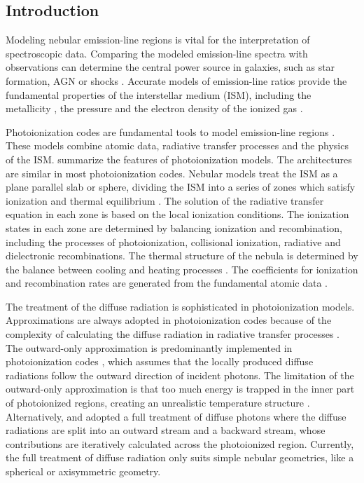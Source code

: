 \documentclass[twocolumn]{aastex62}
\begin{document}
\begin{CJK*}{UTF8}{gbsn}
\section{Introduction}\label{sec:intro}

Modeling nebular emission-line regions is vital for the interpretation of spectroscopic data.
Comparing the modeled emission-line spectra with observations can determine the central power source in galaxies, such as star formation, AGN or shocks \citep{Baldwin-1981,Veilleux-1987,Osterbrock-1992,Kewley-2001,D'Agostino-2019,Byler-2020}. 
Accurate models of emission-line ratios provide the fundamental properties of the interstellar medium (ISM), including the metallicity \citep{Tremonti-2004,Yuan-2013,Yabe-2015,Sanders-2020}, the pressure and the electron density of the ionized gas \citep{Kaasinen-2017,Kewley-2019,Harshan-2020,Davies-2021}. 

Photoionization codes are fundamental tools to model emission-line regions \citep{Ferland-1998,Netzer-1993,Sutherland-1993,Ercolano-2003,Morisset-2006}. 
These models combine atomic data, radiative transfer processes and the physics of the ISM.
\cite{Ferland-1995} summarize the features of photoionization models.
The architectures are similar in most photoionization codes. 
Nebular models treat the ISM as a plane parallel slab or sphere, dividing the ISM into a series of zones which satisfy ionization and thermal equilibrium \citep{Dopita-2000,Groves-2004}.
The solution of the radiative transfer equation in each zone is based on the local ionization conditions.
The ionization states in each zone are determined by balancing ionization and recombination, including the processes of photoionization, collisional ionization, radiative and dielectronic recombinations. 
The thermal structure of the nebula is determined by the balance between cooling and heating processes \citep{Sutherland-1993}.
The coefficients for ionization and recombination rates are generated from the fundamental atomic data \citep[See][for a review]{Stasinska-2002}.

The treatment of the diffuse radiation is sophisticated in photoionization models.
Approximations are always adopted in photoionization codes because of the complexity of calculating the diffuse radiation in radiative transfer processes \citep{Wood-2004}.
The outward-only approximation is predominantly implemented in photoionization codes \citep{Ferland-1998,Netzer-1993,Binette-1985}, which assumes that the locally produced diffuse radiations follow the outward direction of incident photons. 
The limitation of the outward-only approximation is that too much energy is trapped in the inner part of photoionized regions, creating an unrealistic temperature structure \citep{Blandford-1990}.
Alternatively, \cite{Harrington-1968} and \cite{Rubin-1991} adopted a full treatment of diffuse photons where the diffuse radiations are split into an outward stream and a backward stream, whose contributions are iteratively calculated across the photoionized region.
Currently, the full treatment of diffuse radiation only suits simple nebular geometries, like a spherical or axisymmetric geometry.


\end{CJK*}
\end{document}

